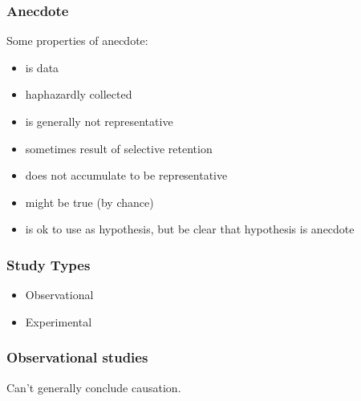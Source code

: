 \begin{frame}
  \frametitle{Anecdote}

  Some properties of anecdote:
  
  \begin{itemize}
  \item is data
  \item haphazardly collected
  \item is generally not representative
  \item sometimes result of selective retention
  \item does not accumulate to be representative
  \item might be true (by chance)
  \item is ok to use as hypothesis, but be clear that hypothesis is anecdote
  \end{itemize}
\end{frame}

\begin{frame}
  \frametitle{Study Types}

  \begin{itemize}
  \item Observational
  \item Experimental
  \end{itemize}
  
  \cnote {
    
  }

\end{frame}

\begin{frame}
  \frametitle{Observational studies}

  Can't generally conclude causation.

  
\end{frame}

